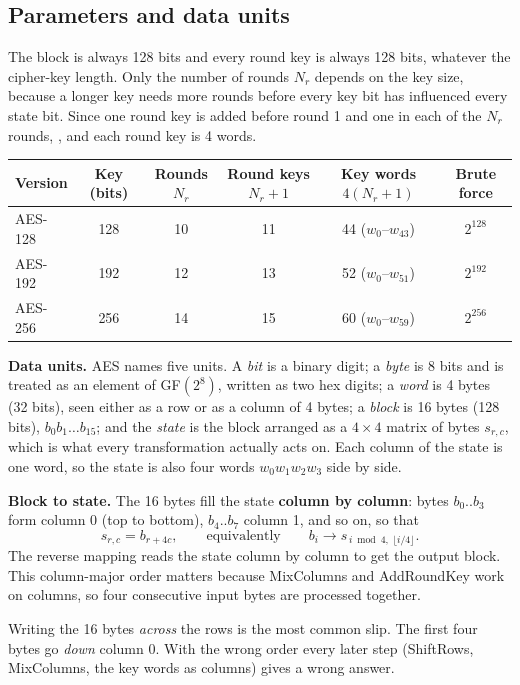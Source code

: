 \subsection{Parameters and data units}
The block is always 128 bits and every round key is always 128 bits, whatever the cipher-key length. Only the number of rounds $N_r$ depends on the key size, because a longer key needs more rounds before every key bit has influenced every state bit. Since one round key is added before round 1 and one in each of the $N_r$ rounds, , and each round key is 4 words.
\begin{center}\small
\begin{tabular}{@{}lccccc@{}}
\toprule
Version & Key (bits) & Rounds $N_r$ & Round keys $N_r + 1$ & Key words $4(N_r + 1)$ & Brute force\\
\midrule
AES-128 & 128 & 10 & 11 & 44 ($w_0$--$w_{43}$) & $2^{128}$\\
AES-192 & 192 & 12 & 13 & 52 ($w_0$--$w_{51}$) & $2^{192}$\\
AES-256 & 256 & 14 & 15 & 60 ($w_0$--$w_{59}$) & $2^{256}$\\
\bottomrule
\end{tabular}
\end{center}

\textbf{Data units.} AES names five units. A \emph{bit} is a binary digit; a \emph{byte} is 8 bits and is treated as an element of GF$(2^8)$, written as two hex digits; a \emph{word} is 4 bytes (32 bits), seen either as a row or as a column of 4 bytes; a \emph{block} is 16 bytes (128 bits), $b_0 b_1 \dots b_{15}$; and the \emph{state} is the block arranged as a $4 \times 4$ matrix of bytes $s_{r,c}$, which is what every transformation actually acts on. Each column of the state is one word, so the state is also four words $w_0 w_1 w_2 w_3$ side by side.

\textbf{Block to state.} The 16 bytes fill the state \textbf{column by column}: bytes $b_0..b_3$ form column 0 (top to bottom), $b_4..b_7$ column 1, and so on, so that
\[
s_{r,c} = b_{r + 4c}, \qquad\text{equivalently}\qquad b_i \to s_{\,i \bmod 4,\; \lfloor i/4 \rfloor}.
\]
The reverse mapping reads the state column by column to get the output block. This column-major order matters because MixColumns and AddRoundKey work on columns, so four consecutive input bytes are processed together.

\begin{trap}
Writing the 16 bytes \emph{across} the rows is the most common slip. The first four bytes go \emph{down} column 0. With the wrong order every later step (ShiftRows, MixColumns, the key words as columns) gives a wrong answer.
\end{trap}

